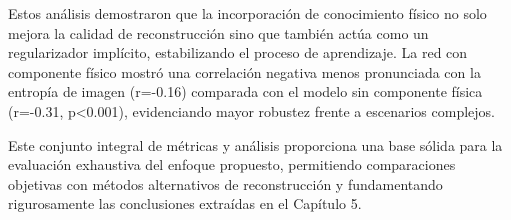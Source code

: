 Estos análisis demostraron que la incorporación de conocimiento físico no solo mejora la calidad de reconstrucción sino que también actúa como un regularizador implícito, estabilizando el proceso de aprendizaje. La red con componente físico mostró una correlación negativa menos pronunciada con la entropía de imagen (r=-0.16) comparada con el modelo sin componente física (r=-0.31, p<0.001), evidenciando mayor robustez frente a escenarios complejos.

Este conjunto integral de métricas y análisis proporciona una base sólida para la evaluación exhaustiva del enfoque propuesto, permitiendo comparaciones objetivas con métodos alternativos de reconstrucción y fundamentando rigurosamente las conclusiones extraídas en el Capítulo 5.